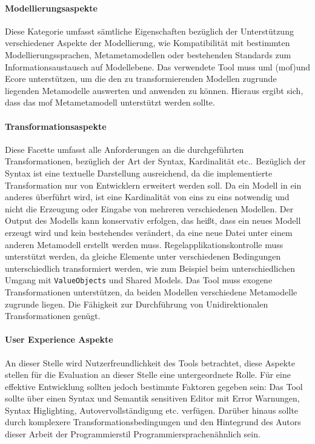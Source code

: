 \documentclass[
	oneside,  %
	ngerman, 
	final, 
	11pt, 
	a4paper, 
	1.1headlines, 
	headinclude=false, 
	footinclude=false, 
	mpinclude=false, 
	pagesize, 
	onecolumn, 
	titlepage, 
	parskip=half, 
	headsepline, 
	chapterprefix=false, 
	version=first, 
	listof=totoc, 
	bibliography=totoc, 
	toc=graduated, 
	fleqn
]{scrbook}
\begin{document}
\paragraph{Modellierungsaspekte}
Diese Kategorie umfasst sämtliche Eigenschaften bezüglich der Unterstützung verschiedener Aspekte der Modellierung, wie Kompatibilität mit bestimmten Modellierungssprachen, Metametamodellen oder bestehenden Standards zum Informationsaustausch auf Modellebene. Das verwendete Tool muss \ac{uml} (\ac{mof})und Ecore unterstützen, um die den zu transformierenden Modellen zugrunde liegenden Metamodelle auswerten und anwenden zu können. Hieraus ergibt sich, dass das \ac{mof} Metametamodell unterstützt werden sollte.
\paragraph{Transformationsaspekte}
Diese Facette umfasst alle Anforderungen an die durchgeführten Transformationen, bezüglich der Art der Syntax, Kardinalität etc.. Bezüglich der Syntax ist eine textuelle Darstellung ausreichend, da die implementierte Transformation nur von Entwicklern erweitert werden soll. Da ein Modell in ein anderes überführt wird, ist eine Kardinalität von eins zu eins notwendig und nicht die Erzeugung oder Eingabe von mehreren verschiedenen Modellen. Der Output des Modells kann konservativ erfolgen, das heißt, dass ein neues Modell erzeugt wird und kein bestehendes verändert, da eine neue Datei unter einem anderen Metamodell erstellt werden muss. Regelapplikationskontrolle muss unterstützt werden, da gleiche Elemente unter verschiedenen Bedingungen unterschiedlich transformiert werden, wie zum Beispiel beim unterschiedlichen Umgang mit \texttt{ValueObjects} und Shared Models. Das Tool muss exogene Transformationen unterstützen, da beiden Modellen verschiedene Metamodelle zugrunde liegen. Die Fähigkeit zur Durchführung von Unidirektionalen Transformationen genügt.
\paragraph{User Experience Aspekte}
An dieser Stelle wird Nutzerfreundlichkeit des Tools betrachtet, diese Aspekte stellen für die Evaluation an dieser Stelle eine untergeordnete Rolle. Für eine effektive Entwicklung sollten jedoch bestimmte Faktoren gegeben sein: Das Tool sollte über einen Syntax und Semantik sensitiven Editor mit Error Warnungen, Syntax Higlighting, Autovervollständigung etc. verfügen. Darüber hinaus sollte durch komplexere Transformationsbedingungen und den Hintegrund des Autors dieser Arbeit der Programmierstil Programmiersprachenähnlich sein.
\end{document}
